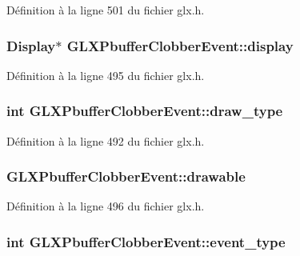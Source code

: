 Définition à la ligne 501 du fichier glx.\-h.

\hypertarget{struct_g_l_x_pbuffer_clobber_event_aeb49bb93cc59448e75d66170a39596d1}{
\subsubsection[{display}]{\setlength{\rightskip}{0pt plus 5cm}Display$\ast$ G\-L\-X\-Pbuffer\-Clobber\-Event\-::display}}\label{struct_g_l_x_pbuffer_clobber_event_aeb49bb93cc59448e75d66170a39596d1}


Définition à la ligne 495 du fichier glx.\-h.

\hypertarget{struct_g_l_x_pbuffer_clobber_event_a243f92b79d3cfbde73eab02815be2320}{
\subsubsection[{draw\-\_\-type}]{\setlength{\rightskip}{0pt plus 5cm}int G\-L\-X\-Pbuffer\-Clobber\-Event\-::draw\-\_\-type}}\label{struct_g_l_x_pbuffer_clobber_event_a243f92b79d3cfbde73eab02815be2320}


Définition à la ligne 492 du fichier glx.\-h.

\hypertarget{struct_g_l_x_pbuffer_clobber_event_a388908b766e35205c1a461ea8b60439f}{
\subsubsection[{drawable}]{ G\-L\-X\-Pbuffer\-Clobber\-Event\-::drawable}}\label{struct_g_l_x_pbuffer_clobber_event_a388908b766e35205c1a461ea8b60439f}


Définition à la ligne 496 du fichier glx.\-h.

\hypertarget{struct_g_l_x_pbuffer_clobber_event_a30d7162d8d77246b01f5e610cda4da68}{
\subsubsection[{event\-\_\-type}]{\setlength{\rightskip}{0pt plus 5cm}int G\-L\-X\-Pbuffer\-Clobber\-Event\-::event\-\_\-type}}\label{struct_g_l_x_pbuffer_clobber_event_a30d7162d8d77246b01f5e610cda4da68}


